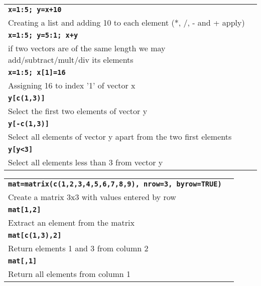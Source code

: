 \documentclass{article}
\begin{document}
\begin{multicols}{2}
\begin{tabularx}{\textwidth/2}{X|l}
    \texttt{\textbf{x=1:5; y=x+10}}\\
    \color{lightgray3}Creating a list and adding 10 to each element (*, /, - and + apply)\\
    \hline
    
    \texttt{\textbf{x=1:5; y=5:1; x+y}}\\
    \color{lightgray3}if two vectors are of the same length we may add/subtract/mult/div its elements\\
    \hline
    
    \texttt{\textbf{x=1:5; x[1]=16}}\\
    \color{lightgray3}Assigning 16 to index '1' of vector x\\
    \hline
    
    \texttt{\textbf{y[c(1,3)]}}\\
    \color{lightgray3}Select the first two elements of vector y\\
    \hline
    
    \texttt{\textbf{y[-c(1,3)]}}\\
    \color{lightgray3}Select all elements of vector y apart from the two first elements\\
    \hline
    
    \texttt{\textbf{y[y<3]}}\\
    \color{lightgray3}Select all elements less than 3 from vector y\\
    \hline 
  \end{tabularx}
  

  \begin{tabularx}{\textwidth/2}{X|l}  
    \texttt{\textbf{mat=matrix(c(1,2,3,4,5,6,7,8,9), nrow=3, byrow=TRUE)}}\\
    \color{lightgray3}Create a matrix 3x3 with values entered by row\\
    \hline
     
    \texttt{\textbf{mat[1,2]}}\\
    \color{lightgray3}Extract an element from the matrix\\
    \hline
    
    \texttt{\textbf{mat[c(1,3),2]}}\\
    \color{lightgray3}Return elements 1 and 3 from column 2\\
    \hline
    
    \texttt{\textbf{mat[,1]}}\\
    \color{lightgray3}Return all elements from column 1\\
    \hline
    

\end{tabularx}
\end{multicols}
\end{document}
